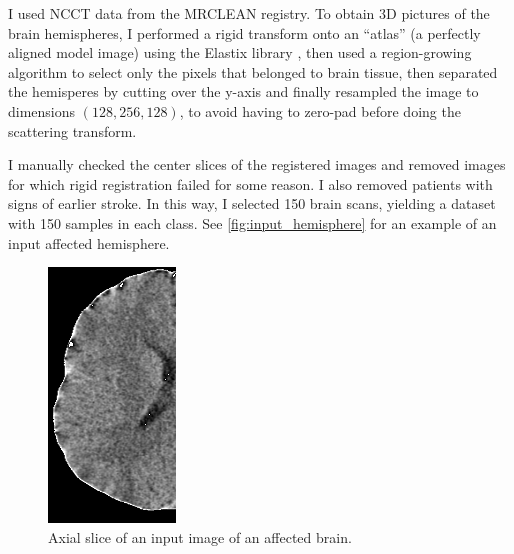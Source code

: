 \documentclass[twocolumn, openany, oneside, article]{memoir}
\begin{document}
I used NCCT data from the MRCLEAN registry. To obtain 3D pictures of the brain
hemispheres, I performed a rigid transform onto an \enquote{atlas} (a perfectly
aligned model image) using the Elastix library \cite{elastix}, then used a
region-growing algorithm to select only the pixels that belonged to brain
tissue, then separated the hemisperes by cutting over the y-axis and finally
resampled the image to dimensions $(128, 256, 128)$, to avoid having to zero-pad
before doing the scattering transform.

I manually checked the center slices of the registered images and removed images
for which rigid registration failed for some reason. I also removed patients
with signs of earlier stroke. In this way, I selected 150 brain scans, yielding
a dataset with 150 samples in each class. See \autoref{fig:input_hemisphere} for
an example of an input affected hemisphere.

\begin{figure}
  \includegraphics[width=0.6\linewidth]{hemisphere_slice}
  \caption{Axial slice of an input image of an affected brain.}
  \label{fig:input_hemisphere}
\end{figure}
\end{document}
